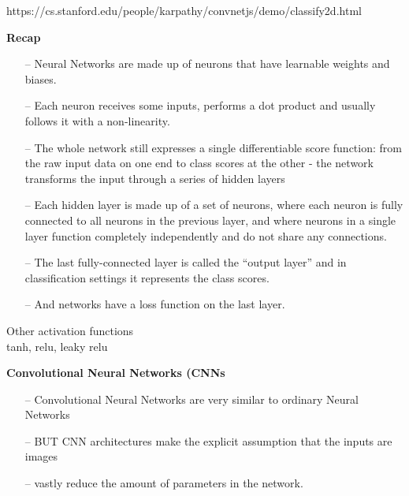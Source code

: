 \documentclass[10pt, compress]{beamer}
\begin{document}
\begin{frame}
  https://cs.stanford.edu/people/karpathy/convnetjs/demo/classify2d.html \\
\end{frame}

\begin{frame}
  \vspace{1cm}
  \textbf{Recap} \\
  \begin{itemize}
    \item[--] Neural Networks are made up of neurons that have learnable weights and biases.
    \item[--] Each neuron receives some inputs, performs a dot product and usually follows it with a non-linearity.
    \item[--] The whole network still expresses a single differentiable score function: from the raw input data on one end to class scores at the other - the network transforms the input through a series of hidden layers
    \item[--] Each hidden layer is made up of a set of neurons, where each neuron is fully connected to all neurons in the previous layer, and where neurons in a single layer function completely independently and do not share any connections.
    \item[--] The last fully-connected layer is called the “output layer” and in classification settings it represents the class scores.
    \item[--] And networks have a loss function on the last layer.
  \end{itemize}

\end{frame}

\begin{frame}
  Other activation functions \\
  tanh, relu, leaky relu
\end{frame}

\begin{frame}
  \textbf{Convolutional Neural Networks (CNNs} \\ \hfill \break
  \begin{itemize}
    \item[--] Convolutional Neural Networks are very similar to ordinary Neural Networks
    \item[--] BUT CNN architectures make the explicit assumption that the inputs are images
    \item[--] vastly reduce the amount of parameters in the network.
  \end{itemize}
\end{frame}
\end{document}
